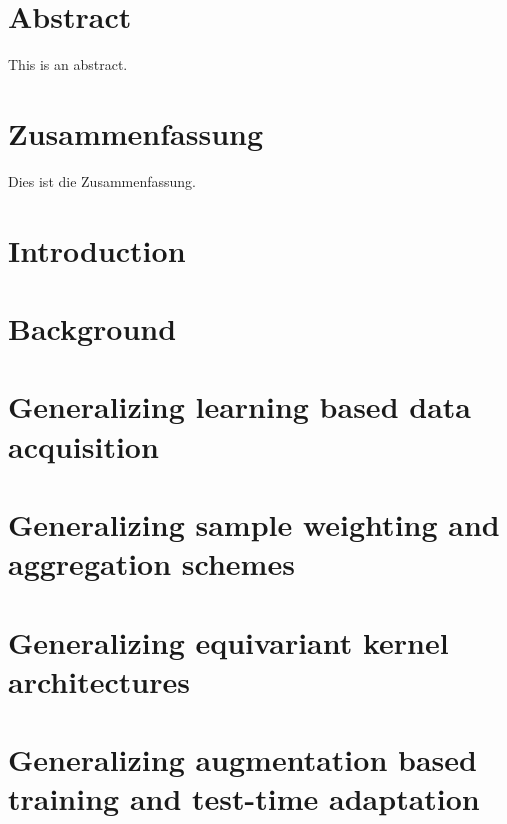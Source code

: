 \documentclass[11pt, a4paper, oneside, headsepline, titlepage, DIV=11, BCOR=12mm, captions=tableheading, chapterprefix=on, numbers=noenddot]{scrbook}
\begin{document}
    \thispagestyle{headings}
    

    \enlargethispage{1\baselineskip}
    \setcounter{page}{1}

    \chapter*{Abstract} %
        This is an abstract.
    \cleardoublepage

    \chapter*{Zusammenfassung} %
        Dies ist die Zusammenfassung.
    \cleardoublepage

    \tableofcontents
    \cleardoublepage

    \chapter{Introduction} %
    

    \chapter{Background} %
    

    \chapter{Generalizing learning based data acquisition}
        

    \chapter{Generalizing sample weighting and aggregation schemes}
        

    \chapter{Generalizing equivariant kernel architectures}
        

    \chapter{Generalizing augmentation based training and test-time adaptation}
        
\end{document}
